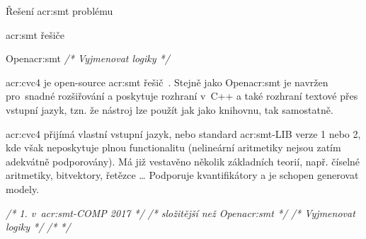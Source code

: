 \documentclass[thesis=M,czech]{FITthesis}[2012/06/26]
\newcommand{\acrlabel}[1]{acr:#1}
\newcommand{\acr}[1]{\acrshort{\acrlabel{#1}}}
\newcommand{\cmt}[1]{\textit{/* #1 */}}
\newcommand{\cit}[1]{\cite{#1}}
\begin{document}
\begin{section}{Řešení \acr{smt} problému}
\begin{subsection}{\acr{smt} řešiče}
\begin{paragraph}{Open\acr{smt}}
\cmt{Vyjmenovat logiky}
\end{paragraph} %


\begin{paragraph}{\acr{cvc}4}\label{p:search:smt:solver:cvc4}
je open-source \acr{smt} řešič~\cit{cvc4}.
Stejně jako Open\acr{smt} je navržen
pro~snadné rozšiřování a poskytuje rozhraní v~C++
a také rozhraní textové přes vstupní jazyk,
tzn. že nástroj lze použít jak jako knihovnu,
tak samostatně.

\acr{cvc}4 přijímá vlastní vstupní jazyk,
nebo standard \acr{smt}-LIB verze 1 nebo 2,
kde však neposkytuje plnou functionalitu
(nelineární aritmetiky nejsou zatím adekvátně podporovány).
Má již vestavěno několik základních teorií,
např. číselné aritmetiky, bitvektory, řetězce \dots
Podporuje kvantifikátory
a je schopen generovat modely.

\cmt{1. v~\acr{smt}-COMP 2017}
\cmt{složitější než Open\acr{smt}}
\cmt{Vyjmenovat logiky}
\cmt{\cit{cvc4-art}}
\end{paragraph} %


\end{subsection} %


\end{section} %

\end{document}
